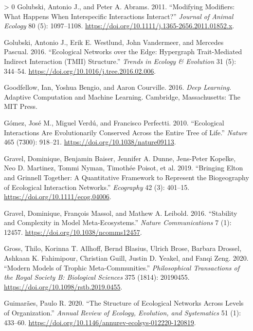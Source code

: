 \documentclass[10pt,oneside]{article}
\newlength{\cslhangindent}
\newenvironment{CSLReferences}[3] %
 {%
  \setlength{\parindent}{0pt}
  \ifodd #1 \everypar{\setlength{\hangindent}{\cslhangindent}}\ignorespaces\fi
  \ifnum #2 > 0
  \setlength{\parskip}{#2\baselineskip}
  \fi
 }%
 {}
\begin{document}
\begin{CSLReferences}{1}{0}
\leavevmode\hypertarget{ref-Golubski2011ModMod}{}%
Golubski, Antonio J., and Peter A. Abrams. 2011. {``Modifying Modifiers:
What Happens When Interspecific Interactions Interact?''} \emph{Journal
of Animal Ecology} 80 (5): 1097--1108.
\url{https://doi.org/10.1111/j.1365-2656.2011.01852.x}.

\leavevmode\hypertarget{ref-Golubski2016EcoNet}{}%
Golubski, Antonio J., Erik E. Westlund, John Vandermeer, and Mercedes
Pascual. 2016. {``Ecological Networks over the Edge: Hypergraph
Trait-Mediated Indirect Interaction (TMII) Structure.''} \emph{Trends in
Ecology \& Evolution} 31 (5): 344--54.
\url{https://doi.org/10.1016/j.tree.2016.02.006}.

\leavevmode\hypertarget{ref-Goodfellow2016DeeLea}{}%
Goodfellow, Ian, Yoshua Bengio, and Aaron Courville. 2016. \emph{Deep
Learning}. Adaptive Computation and Machine Learning. Cambridge,
Massachusetts: The MIT Press.

\leavevmode\hypertarget{ref-Gomez2010EcoInt}{}%
Gómez, José M., Miguel Verdú, and Francisco Perfectti. 2010.
{``Ecological Interactions Are Evolutionarily Conserved Across the
Entire Tree of Life.''} \emph{Nature} 465 (7300): 918--21.
\url{https://doi.org/10.1038/nature09113}.

\leavevmode\hypertarget{ref-Gravel2019BriElt}{}%
Gravel, Dominique, Benjamin Baiser, Jennifer A. Dunne, Jens-Peter
Kopelke, Neo D. Martinez, Tommi Nyman, Timothée Poisot, et al. 2019.
{``Bringing Elton and Grinnell Together: A Quantitative Framework to
Represent the Biogeography of Ecological Interaction Networks.''}
\emph{Ecography} 42 (3): 401--15.
\url{https://doi.org/10.1111/ecog.04006}.

\leavevmode\hypertarget{ref-Gravel2016StaCom}{}%
Gravel, Dominique, François Massol, and Mathew A. Leibold. 2016.
{``Stability and Complexity in Model Meta-Ecosystems.''} \emph{Nature
Communications} 7 (1): 12457. \url{https://doi.org/10.1038/ncomms12457}.

\leavevmode\hypertarget{ref-Gross2020ModMod}{}%
Gross, Thilo, Korinna T. Allhoff, Bernd Blasius, Ulrich Brose, Barbara
Drossel, Ashkaan K. Fahimipour, Christian Guill, Justin D. Yeakel, and
Fanqi Zeng. 2020. {``Modern Models of Trophic Meta-Communities.''}
\emph{Philosophical Transactions of the Royal Society B: Biological
Sciences} 375 (1814): 20190455.
\url{https://doi.org/10.1098/rstb.2019.0455}.

\leavevmode\hypertarget{ref-Guimaraes2020StrEco}{}%
Guimarães, Paulo R. 2020. {``The Structure of Ecological Networks Across
Levels of Organization.''} \emph{Annual Review of Ecology, Evolution,
and Systematics} 51 (1): 433--60.
\url{https://doi.org/10.1146/annurev-ecolsys-012220-120819}.


\end{CSLReferences}
\end{document}
